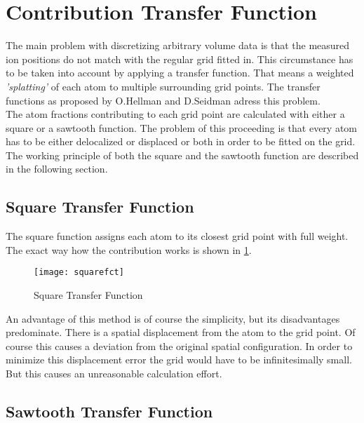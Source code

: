 \section{Contribution Transfer Function}
\label{contribution transfer function}

The main problem with discretizing arbitrary volume data is that the measured ion positions do not match with the regular grid fitted in. This circumstance has to be taken into account by applying a transfer function. That means a weighted \emph{'splatting'} of each atom to multiple surrounding grid points.
The transfer functions as proposed by O.Hellman and D.Seidman \cite{Hel02a} adress this problem.\\
The atom fractions contributing to each grid point are calculated with either a square or a sawtooth function. The problem of this proceeding is that every atom has to be either delocalized or displaced or both in order to be fitted on the grid.\\

The working principle of both the square and the sawtooth function are described in the following section.

\subsection{Square Transfer Function}

The square function assigns each atom to its closest grid point with full weight.
The exact way how the contribution works is shown in \cref{fig:squarefunction}.

\begin{figure}[H]
	\centering
	\texttt{[image: squarefct]}
	\caption{Square Transfer Function \label{fig:squarefunction}}
\end{figure}

An advantage of this method is of course the simplicity, but its disadvantages predominate. There is a spatial displacement from the atom to the grid point. Of course this causes a deviation from the original spatial configuration. In order to minimize this displacement error the grid would have to be infinitesimally small. But this causes an unreasonable calculation effort.

\subsection{Sawtooth Transfer Function}

